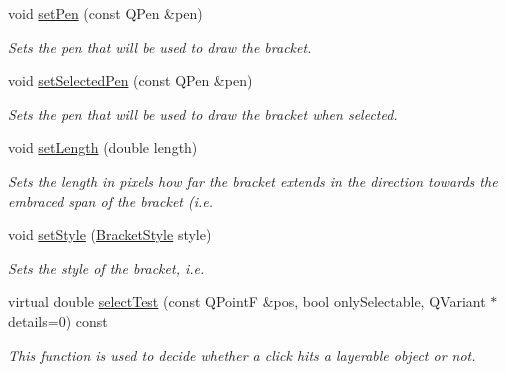 \begin{DoxyCompactItemize}
\item 
void \hyperlink{classQCPItemBracket_ab13001d9cc5d8f9e56ea15bdda682acb}{set\+Pen} (const Q\+Pen \&pen)
\begin{DoxyCompactList}\small\item\em Sets the pen that will be used to draw the bracket. \end{DoxyCompactList}\item 
void \hyperlink{classQCPItemBracket_a349785c31122778a520c64891fa204c5}{set\+Selected\+Pen} (const Q\+Pen \&pen)
\begin{DoxyCompactList}\small\item\em Sets the pen that will be used to draw the bracket when selected. \end{DoxyCompactList}\item 
void \hyperlink{classQCPItemBracket_ac7cfc3da7da9b5c5ac5dfbe4f0351b2a}{set\+Length} (double length)
\begin{DoxyCompactList}\small\item\em Sets the {\itshape length} in pixels how far the bracket extends in the direction towards the embraced span of the bracket (i.\+e. \end{DoxyCompactList}\item 
void \hyperlink{classQCPItemBracket_a612dffa2373422eef8754d690add3703}{set\+Style} (\hyperlink{classQCPItemBracket_a7ac3afd0b24a607054e7212047d59dbd}{Bracket\+Style} style)
\begin{DoxyCompactList}\small\item\em Sets the style of the bracket, i.\+e. \end{DoxyCompactList}\item 
virtual double \hyperlink{classQCPItemBracket_aa6933caff1d42c54bcebc769ef88c798}{select\+Test} (const Q\+Point\+F \&pos, bool only\+Selectable, Q\+Variant $\ast$details=0) const 
\begin{DoxyCompactList}\small\item\em This function is used to decide whether a click hits a layerable object or not. \end{DoxyCompactList}\end{DoxyCompactItemize}
